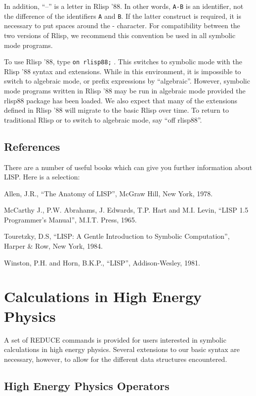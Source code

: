 \documentclass[11pt,letterpaper]{book}
\makeatletter
\newcommand{\REDUCE}{REDUCE}
\newcommand{\underscore}{\_}
\newcommand{\ttindex}[1]{{\renewcommand{\_}{\protect\underscore}%
                          \index{#1@{\tt #1}}}}
\makeatother
\begin{document}
In addition, ``--'' is a letter in Rlisp '88.  In other words, {\tt A-B} is an
identifier, not the difference of the identifiers {\tt A} and {\tt B}.  If
the latter construct is required, it is necessary to put spaces around the
- character.  For compatibility between the two versions of Rlisp, we
recommend this convention be used in all symbolic mode programs.

To use Rlisp '88, type {\tt on rlisp88;}\ttindex{RLISP88}.  This switches to
symbolic mode with the Rlisp '88 syntax and extensions.  While in this
environment, it is impossible to switch to algebraic mode, or prefix
expressions by ``algebraic''.  However, symbolic mode programs written in
Rlisp '88 may be run in algebraic mode provided the rlisp88 package has been
loaded.  We also expect that many of the extensions defined in Rlisp '88
will migrate to the basic Rlisp over time.  To return to traditional Rlisp
or to switch to algebraic mode, say ``off rlisp88''.

\section{References}

There are a number of useful books which can give you further information
about LISP. Here is a selection:

 Allen, J.R., ``The Anatomy of LISP'', McGraw Hill, New York, 1978.

 McCarthy J., P.W. Abrahams, J. Edwards, T.P. Hart and
     M.I. Levin, ``LISP 1.5 Programmer's Manual'', M.I.T. Press, 1965.

 Touretzky, D.S, ``{LISP}: A Gentle Introduction to Symbolic Computation'',
 Harper \& Row, New York, 1984.

 Winston, P.H. and Horn, B.K.P., ``LISP'', Addison-Wesley, 1981.

\chapter{Calculations in High Energy Physics}

A set of {\REDUCE} commands is provided for users interested in symbolic
calculations in high energy physics. Several extensions to our basic
syntax are necessary, however, to allow for the different data structures
encountered.

\section{High Energy Physics Operators}
\label{HEPHYS}
\end{document}

